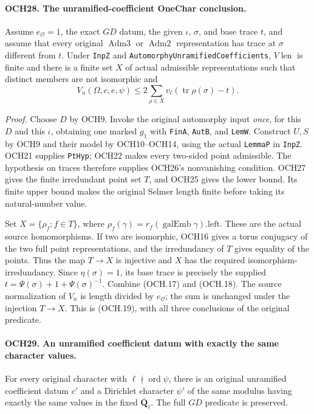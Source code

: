 \paragraph{OCH28. The unramified-coefficient OneChar conclusion.}
\label{claim:OCH28}
Assume \(e_{\mathcal O}=1\), the exact \(GD\) datum, the
given \(\iota\), \(\sigma\), and base trace \(t\), and
assume that every original \(\operatorname{Adm3}\) or
\(\operatorname{Adm2}\) representation has trace at
\(\sigma\) different from \(t\).  Under \texttt{InpZ} and
\texttt{AutomorphyUnramifiedCoefficients}, \(V\!\operatorname{len}\)
is finite and there is a finite set \(X\) of actual admissible
representations such that distinct members are not isomorphic and
\[
             V_n(\Omega,c,e,\psi)
                \le2\sum_{\rho\in X}
                       v_\ell(\operatorname{tr}\rho(\sigma)-t).
 \tag{OCH.19}
\]

\emph{Proof.}
Choose \(D\) by OCH9.  Invoke the original automorphy input
\emph{once}, for this \(D\) and this \(\iota\), obtaining
one marked \(g_1\) with \texttt{FinA}, \texttt{AutB}, and
\texttt{LemW}.  Construct \(U,S\) by OCH9 and their model
by OCH10--OCH14, using the actual \texttt{LemmaP} in
\texttt{InpZ}.  OCH21 supplies \texttt{PtHyp}; OCH22 makes
every two-sided point admissible.  The hypothesis on traces
therefore supplies OCH26's nonvanishing condition.
OCH27 gives the finite irredundant point set \(T\), and OCH25
gives the lower bound.  Its finite upper bound makes the original
Selmer length finite before taking its natural-number value.

Set \(X=\{\rho_f:f\in T\}\), where
\(\rho_f(\gamma)=r_f(\operatorname{galEmb}\gamma).\mathrm{left}\).
These are the actual source homomorphisms.  If two are isomorphic,
OCH16 gives a torus conjugacy of the two full point representations,
and the irredundancy of \(T\) gives equality of the points.
Thus the map \(T\to X\) is injective and \(X\) has the
required isomorphism-irredundancy.  Since \(\eta(\sigma)=1\),
its base trace is precisely the supplied
\(t=\Psi(\sigma)+1+\Psi(\sigma)^{-1}\).
Combine (OCH.17) and (OCH.18).  The source normalization of
\(V_n\) is length divided by \(e_{\mathcal O}\); the sum
is unchanged under the injection \(T\to X\).  This is
(OCH.19), with all three conclusions of the original predicate.

\paragraph{OCH29. An unramified coefficient datum with exactly the same character values.}
\label{claim:OCH29}
For every original character with \(\ell\nmid\operatorname{ord}\psi\),
there is an original unramified coefficient datum \(c'\) and a
Dirichlet character \(\psi'\) of the same modulus having
exactly the same values in the fixed
\(\overline{\mathbf Q}_\ell\).  The full \(GD\) predicate
is preserved.

